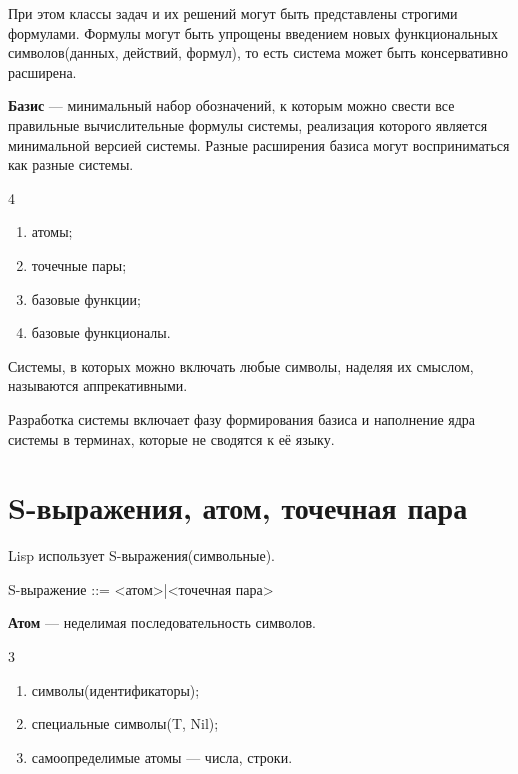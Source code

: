При этом классы задач и их решений могут быть представлены строгими формулами. Формулы могут быть 
упрощены введением новых функциональных символов(данных, действий, формул), то есть система может быть 
консервативно расширена.

\textbf{Базис} — минимальный набор обозначений, к которым можно свести все правильные вычислительные формулы системы,
реализация которого является минимальной версией системы. Разные расширения базиса могут восприниматься 
как разные системы.

\begin{listbox}{\noindent \begin{listboxtitle}{}4\end{listboxtitle} 
	}
\begin{enumerate}
	\item атомы;
	\item точечные пары;
	\item базовые функции;
	\item базовые функционалы.
\end{enumerate}
\end{listbox}

Системы, в которых можно включать любые символы, наделяя их смыслом, называются аппрекативными.

Разработка системы включает фазу формирования базиса и наполнение ядра системы в терминах, которые
не сводятся к её языку.

\section{S-выражения, атом, точечная пара}

Lisp использует S-выражения(символьные).

\begin{center}
	S-выражение ::= <атом>|<точечная пара>
\end{center}

\textbf{Атом} — неделимая последовательность символов.

\begin{listbox}{\noindent \begin{listboxtitle}{}3\end{listboxtitle} 
	}
\begin{enumerate}
	\item символы(идентификаторы);
	\item специальные символы(T, Nil);
	\item самоопределимые атомы — числа, строки.
\end{enumerate}
\end{listbox}

